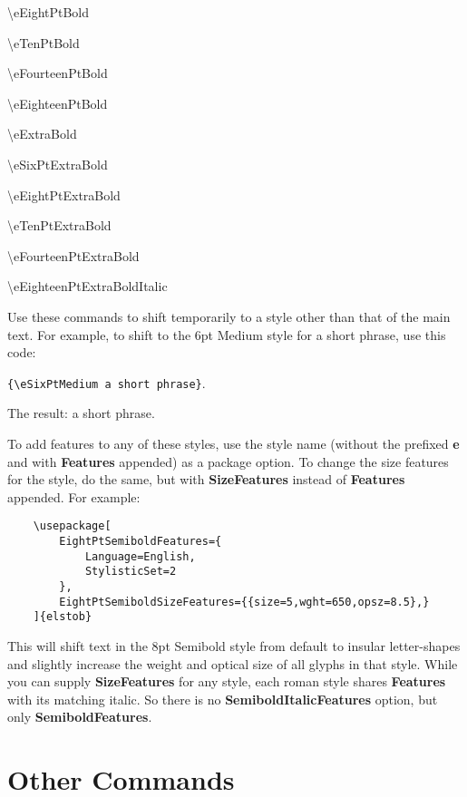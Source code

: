 \documentclass[12pt]{article}
\begin{document}
\begin{multicols}{2}
\noindent\textbackslash eEightPtBold

\noindent\textbackslash eTenPtBold

\noindent\textbackslash eFourteenPtBold

\noindent\textbackslash eEighteenPtBold

\noindent\textbackslash eExtraBold

\noindent\textbackslash eSixPtExtraBold

\noindent\textbackslash eEightPtExtraBold

\noindent\textbackslash eTenPtExtraBold

\noindent\textbackslash eFourteenPtExtraBold

\noindent\textbackslash eEighteenPtExtraBoldItalic
\end{multicols}

\noindent Use these commands
to shift temporarily to a style other than that of the main text.
For example, to shift to the 6pt Medium style for a short phrase, use
this code:
\begin{center}
{\color{BrickRed}\small\verb|{\eSixPtMedium a short phrase}|}.
\end{center}
The result: {\eSixPtMedium a short phrase}.

To add features to any of these styles, use the style name
(without the prefixed \textbf{e} and with \textbf{Features} appended)
as a package option. To change the size features for the style,
do the same, but with \textbf{SizeFeatures} instead of \textbf{Features}
appended. For example:

\footnotesize
\begin{verbatim}
    \usepackage[
        EightPtSemiboldFeatures={
            Language=English,
            StylisticSet=2
        },
        EightPtSemiboldSizeFeatures={{size=5,wght=650,opsz=8.5},}
    ]{elstob}
\end{verbatim}\normalsize

\noindent This will shift text in the 8pt Semibold style from default to insular
letter-shapes and slightly increase the weight and optical size of all glyphs in that style.
While you can supply \textbf{SizeFeatures} for any style, each roman style shares
\textbf{Features} with its matching italic. So there is no \textbf{SemiboldItalicFeatures}
option, but only \textbf{SemiboldFeatures}.

\section{Other Commands}
\end{document}

